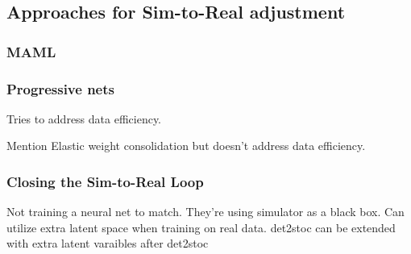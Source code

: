 \documentclass{kththesis}
\begin{document}
\subsection{Approaches for Sim-to-Real adjustment}
\subsubsection*{MAML}

\subsubsection*{Progressive nets}
Tries to address data efficiency.

Mention Elastic weight consolidation but doesn't address data efficiency.
\subsubsection*{Closing the Sim-to-Real Loop}
Not training a neural net to match. They're using simulator as a black box. Can utilize extra latent space when training on real data. det2stoc can be extended with extra latent varaibles after det2stoc








\end{document}
